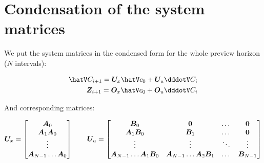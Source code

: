 \documentclass[a4paper]{article}
\begin{document}
\section*{Condensation of the system matrices}

\noindent We put the system matrices in the condensed form for the whole preview horizon ($N$ intervals):

\begin{equation}
\begin{split}
    \cState_{i+1} = \M{U}_{x} \cstate_{0} + \M{U}_{u} \cJerk_{i}\\
    \CoP_{i+1} = \M{O}_{x} \cstate_{0} + \M{O}_{u} \cJerk_{i}
\end{split}
\end{equation}

\noindent And corresponding matrices:

\begin{equation}
    \M{U}_{x} =
        \begin{bmatrix}
        \M{A}_0    \\
        \M{A}_1 \M{A}_0  \\
        \vdots           \\
        \M{A}_{N-1} \dots \M{A}_0 \\
        \end{bmatrix}
    \quad\quad
    \M{U}_{u} =
        \begin{bmatrix}
        \M{B}_0                             & \M{0}                                 & \dots & \M{0} \\
        \M{A}_1 \M{B}_0                     & \M{B}_1                               & \dots & \M{0} \\
        \vdots                              & \vdots                                & \ddots& \vdots \\
        \M{A}_{N-1} \dots \M{A}_1 \M{B}_0   & \M{A}_{N-1} \dots \M{A}_2 \M{B}_1     & \dots & \M{B}_{N-1} \\
        \end{bmatrix}
\end{equation}
\end{document}
